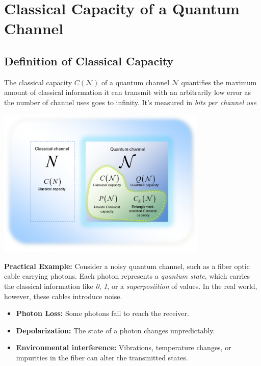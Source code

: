 \section{Classical Capacity of a Quantum Channel}

\subsection{Definition of Classical Capacity}
The classical capacity \( C(\mathcal{N}) \)  of a quantum channel \( \mathcal{N} \) quantifies the maximum amount of classical information it can transmit with an arbitrarily low error as the number of channel uses goes to infinity. It's measured in \textit{bits per channel use}

\begin{center}
    \includegraphics[width=0.75\textwidth]{figures/properties_channels.png}
\end{center}

\textbf{Practical Example:} Consider a noisy quantum channel, such as a fiber optic cable carrying photons. Each photon represents a \textit{quantum state}, which carries the classical information like \textit{0}, \textit{1}, or a \textit{superposiition} of values. In the real world, however, these cables introduce noise. 
\begin{itemize}
    \item \textbf{Photon Loss:} Some photons fail to reach the receiver.
    \item  \textbf{Depolarization:} The state of a photon changes unpredictably.
    \item \textbf{Environmental interference:} Vibrations, temperature changes, or impurities in the fiber can alter the transmitted states.
\end{itemize}

